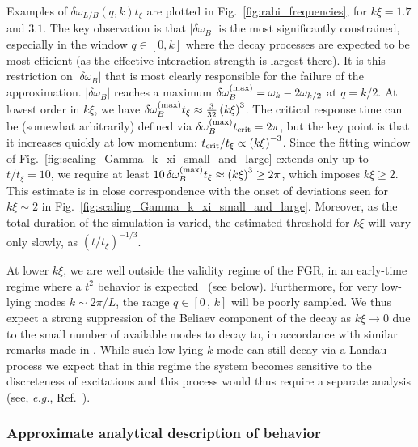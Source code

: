\documentclass[aps,prd,notitlepage,amsfonts,amssymb,amsmath,nofootinbib,superscriptaddress,longbibliography]{revtex4-2}
\begin{document}
\begin{appendices}
Examples of $\delta \omega_{L/B} (q,k) t_{\xi}$ are plotted in Fig.~\ref{fig:rabi_frequencies}, for $k\xi = 1.7$ and $3.1$. The key observation is that $\left|\delta\omega_{B}\right|$ is the most significantly constrained, especially in the window $q \in \left[0,k\right]$ where the decay processes are expected to be most efficient (as the effective interaction strength is largest there).  It is this restriction on $\left|\delta\omega_{B}\right|$ that is most clearly responsible for the failure of the approximation. $\left| \delta \omega_{B} \right|$ reaches a maximum $\delta\omega_{B}^{\rm (max)} = \omega_{k} - 2 \omega_{k/2}$ at $q=k/2$.  At lowest order in $k\xi$, we have $\delta\omega_{B}^{\rm (max)} t_{\xi} \approx \frac{3}{32} \left(k\xi\right)^{3}$. 
The critical response time can be (somewhat arbitrarily) defined via $\delta\omega_{B}^{\rm (max)} t_{\rm crit} = 2\pi$, but the key point is that it increases quickly at low momentum: $t_{\rm crit}/t_{\xi} \propto \left(k\xi\right)^{-3}$.
Since the fitting window of Fig.~\ref{fig:scaling_Gamma_k_xi_small_and_large} extends only up to $t/t_{\xi} = 10$, we require at least $10 \, \delta\omega_{B}^{\rm (max)} t_{\xi} \approx \left(k\xi\right)^{3} \geq 2\pi$, which imposes $k\xi \geq 2$.   This estimate is in close correspondence with the onset of deviations seen for $k\xi \sim 2$ in Fig.~\ref{fig:scaling_Gamma_k_xi_small_and_large}. Moreover, as the total duration of the simulation is varied, the estimated threshold for $k\xi$ will vary only slowly, as $\left(t/t_{\xi}\right)^{-1/3}$. 

At lower $k\xi$, we are well outside the validity regime of the FGR, in an early-time regime where a $t^{2}$ behavior is expected~\cite{Peres1980} (see below). Furthermore, for very low-lying modes $k \sim 2 \pi / L$, the range $q \in \left[0 \,,\, k \right]$ will be  poorly sampled.  We thus expect a strong suppression of the Beliaev component of the decay as $k\xi \to 0$ due to the small number of available modes to decay to, in accordance with similar remarks made in \cite{Fedichev_1998, Pitaevskii_1997}.  While such low-lying $k$ mode can still decay via a Landau process we expect that in this regime the system becomes sensitive to the discreteness of excitations and this process would thus require a separate analysis (see, {\it e.g.}, Ref.~\cite{bayocbocFrequencyBeating2022}). 



\subsubsection{Approximate analytical description of behavior}


\end{appendices}
\end{document}
